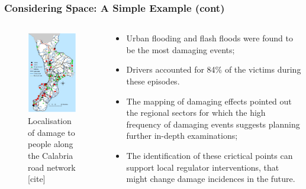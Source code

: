 \documentclass[hyperref={pdfpagelabels=true}]{beamer}
\begin{document}
\begin{frame}
\frametitle{Considering Space: A Simple Example (cont)}
\begin{columns}
  \begin{column}{0.5\textwidth}
    \begin{figure}
    \includegraphics[scale=0.4]{damage2.png}
    \caption{\tiny{ Localisation of damage to people along the Calabria road network [cite]}}    
    \end{figure}
  \end{column}
  \begin{column}{0.5\textwidth}  
  \small{
  \begin{itemize}
  \item Urban flooding and flash floods were found to be the most damaging events;
  \item Drivers accounted for 84\% of the victims during these episodes.
  \item The mapping of damaging effects pointed out the regional sectors for which the high frequency of damaging events suggests planning further in-depth examinations; 
  \item The identification of these crictical points can support local regulator interventions, that might change damage incidences in the future.
  \end{itemize} }
  \end{column}
\end{columns}
\end{frame}
\end{document}
